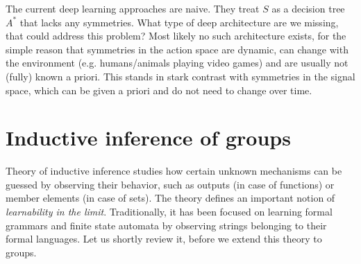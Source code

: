 \documentclass[oneside,english,logo]{amuthesis}
\begin{document}
The current deep learning approaches are naive. They treat $S$ as a decision tree $A^*$ that lacks any symmetries. What type of deep architecture are we missing, that could address this problem? Most likely no such architecture exists, for the simple reason that symmetries in the action space are dynamic, can change with the environment (e.g. humans/animals playing video games) and are usually not (fully) known a priori. This stands in stark contrast with symmetries in the signal space, which can be given a priori and do not need to change over time.


\section{Inductive inference of groups}
\label{subsection:inductive_inference_of_groups}
Theory of inductive inference \cite{deLaHiguera,SOLOMONOFF19641} studies how certain unknown mechanisms can be guessed by observing their behavior, such as outputs (in case of functions) or member elements (in case of sets). The theory defines an important notion of \textit{learnability in the limit}. Traditionally, it has been focused on learning formal grammars and finite state automata by observing strings belonging to their formal languages. Let us shortly review it, before we extend this theory to groups. 
\end{document}
